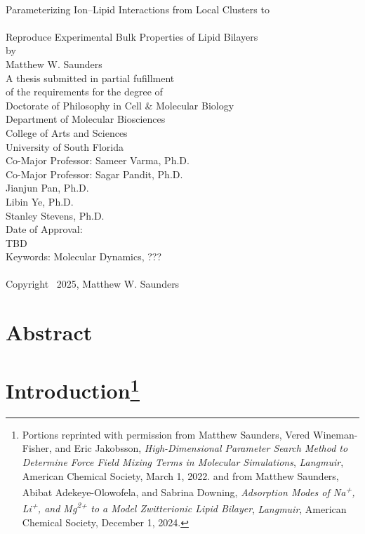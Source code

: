 \documentclass[12pt,openany,final]{book}
\author{Matthew Saunders}
\begin{document}
\pagestyle{plain}
{}
\begin{titlepage}
\begin{centering}

~\\[1in]
Parameterizing Ion–Lipid Interactions from Local Clusters to \\~\\Reproduce Experimental Bulk Properties of Lipid Bilayers
~\\[3\baselineskip]
by
~\\[3\baselineskip]
Matthew W. Saunders
~\\[4\baselineskip]
A thesis submitted in partial fufillment\\
of the requirements for the degree of\\
Doctorate of Philosophy in Cell \& Molecular Biology\\
Department of Molecular Biosciences\\
College of Arts and Sciences\\
University of South Florida
~\\[3\baselineskip]
Co-Major Professor: Sameer Varma, Ph.D.\\
Co-Major Professor: Sagar Pandit, Ph.D.\\
Jianjun Pan, Ph.D.\\
Libin Ye, Ph.D.\\
Stanley Stevens, Ph.D.
~\\[2\baselineskip]
Date of Approval:~\\
TBD
~\\[3\baselineskip]
Keywords: Molecular Dynamics, ???\\
~\\
Copyright \textsuperscript\textcopyright~2025, Matthew W. Saunders\\

\end{centering}
\end{titlepage}
\tableofcontents
\listoftables
\listoffigures

\doublespacing
\clearpage
{}
\chapter*{Abstract}


\chapter[Introduction]{Introduction\footnote{Portions reprinted with permission from Matthew Saunders, Vered Wineman-Fisher, and Eric Jakobsson, \textit{High-Dimensional Parameter Search Method to Determine Force Field Mixing Terms in Molecular Simulations}, 
\textit{Langmuir}, American Chemical Society, March 1, 2022. and from Matthew Saunders, Abibat Adekeye-Olowofela, and Sabrina Downing, \textit{Adsorption Modes of Na\textsuperscript{+}, Li\textsuperscript{+}, and Mg\textsuperscript{2+} to a Model Zwitterionic Lipid Bilayer}, 
\textit{Langmuir}, American Chemical Society, December 1, 2024.}}
 \graphicspath{{CH1/figures/}}

\end{document}
